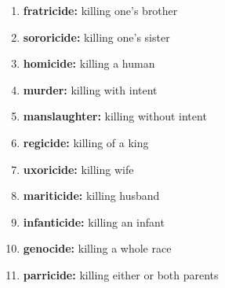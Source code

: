 \documentclass{article}
\begin{document}
\begin{enumerate}
    \item \textbf{fratricide: }{killing one's brother}
    \item \textbf{sororicide: }{killing one's sister}
    \item \textbf{homicide: }{killing a human}
    \item \textbf{murder: }{killing with intent}
    \item \textbf{manslaughter: }{killing without intent}
    \item \textbf{regicide: }{killing of a king}
    \item \textbf{uxoricide: }{killing wife}
    \item \textbf{mariticide: }{killing husband}
    \item \textbf{infanticide: }{killing an infant}
    \item \textbf{genocide: }{killing a whole race}
    \item \textbf{parricide: }{killing either or both parents}
    
\end{enumerate}
\end{document}
